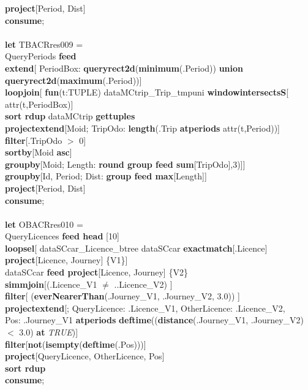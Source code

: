 \documentclass[a4paper]{article}
\newcommand{\op}[1]{\textbf{#1}}
\newcommand{\true}{\textsl{TRUE}}
\begin{document}
\begin{scriptsize}
\begin{tabbing}
\>\op{project}[Period, Dist]\\
\op{consume};\\
\\
\op{let} TBACRres009 =\\
\>QueryPeriods \op{feed}\\
\>\op{extend}[ PeriodBox: \op{queryrect2d}(\op{minimum}(.Period)) \op{union queryrect2d}(\op{maximum}(.Period))]\\
\>\op{loopjoin}[ \op{fun}(t:TUPLE) dataMCtrip\_Trip\_tmpuni \op{windowintersectsS}[ attr(t,PeriodBox)]\\
\>\>\op{sort rdup} dataMCtrip \op{gettuples}\\
\>\>\op{projectextend}[Moid; TripOdo: \op{length}(.Trip \op{atperiods} attr(t,Period))]\\
\>\>\op{filter}[.TripOdo $>$ 0]\\
\>\>\op{sortby}[Moid \op{asc}]\\
\>\>\op{groupby}[Moid; Length: \op{round group feed sum}[TripOdo],3)]]\\
\>\op{groupby}[Id, Period; Dist: \op{group feed max}[Length]]\\
\>\op{project}[Period, Dist]\\
\op{consume};\\
\\
\op{let} OBACRres010 =\\
\>QueryLicences \op{feed head} [10]\\
\>\>\op{loopsel}[ dataSCcar\_Licence\_btree dataSCcar \op{exactmatch}[.Licence]\\
\>\>\>\op{project}[Licence, Journey] \{V1\}]\\
\>dataSCcar \op{feed project}[Licence, Journey] \{V2\}\\
\>\op{simmjoin}[(.Licence\_V1 $\neq$ ..Licence\_V2) ]\\
\>\op{filter}[ (\op{everNearerThan}(.Journey\_V1, .Journey\_V2, 3.0)) ]\\
\>\op{projectextend}[; QueryLicence: .Licence\_V1, OtherLicence: .Licence\_V2,\\
\>\>\>\>Pos: .Journey\_V1 \op{atperiods} \op{deftime}((\op{distance}(.Journey\_V1, .Journey\_V2) $<$ 3.0) \op{at} \true{})]\\
\>\op{filter}[\op{not}(\op{isempty}(\op{deftime}(.Pos)))]\\
\>\op{project}[QueryLicence, OtherLicence, Pos]\\
\>\op{sort rdup}\\
\op{consume};\\

\end{tabbing}
\end{scriptsize}
\end{document}
